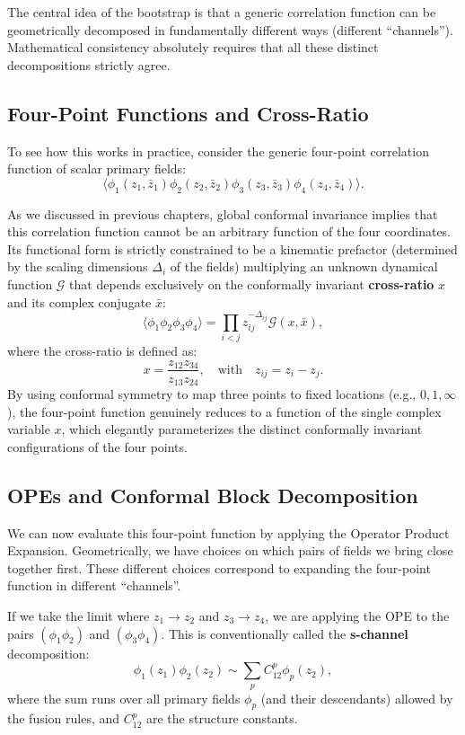 The central idea of the bootstrap is that a generic correlation function can be geometrically decomposed in fundamentally different ways (different ``channels''). Mathematical consistency absolutely requires that all these distinct decompositions strictly agree.

\subsection{Four-Point Functions and Cross-Ratio}

To see how this works in practice, consider the generic four-point correlation function of scalar primary fields:
\[
    \langle \phi_1(z_1, \bar{z}_1) \phi_2(z_2, \bar{z}_2) \phi_3(z_3, \bar{z}_3) \phi_4(z_4, \bar{z}_4) \rangle.
\]

As we discussed in previous chapters, global conformal invariance implies that this correlation function cannot be an arbitrary function of the four coordinates. Its functional form is strictly constrained to be a kinematic prefactor (determined by the scaling dimensions $\Delta_i$ of the fields) multiplying an unknown dynamical function $\mathcal{G}$ that depends exclusively on the conformally invariant \textbf{cross-ratio} $x$ and its complex conjugate $\bar{x}$:
\[
    \langle \phi_1 \phi_2 \phi_3 \phi_4 \rangle = \prod_{i < j} z_{ij}^{-\Delta_{ij}} \mathcal{G}(x, \bar{x}),
\]
where the cross-ratio is defined as:
\[
    x = \frac{z_{12} z_{34}}{z_{13} z_{24}}, \quad \text{with} \quad z_{ij} = z_i - z_j.
\]
By using conformal symmetry to map three points to fixed locations (e.g., $0, 1, \infty$), the four-point function genuinely reduces to a function of the single complex variable $x$, which elegantly parameterizes the distinct conformally invariant configurations of the four points.

\subsection{OPEs and Conformal Block Decomposition}

We can now evaluate this four-point function by applying the Operator Product Expansion. Geometrically, we have choices on which pairs of fields we bring close together first. These different choices correspond to expanding the four-point function in different ``channels''.

If we take the limit where $z_1 \to z_2$ and $z_3 \to z_4$, we are applying the OPE to the pairs $(\phi_1 \phi_2)$ and $(\phi_3 \phi_4)$. This is conventionally called the \textbf{s-channel} decomposition:
\[
    \phi_1(z_1)\phi_2(z_2) \sim \sum_p C_{12}^p \phi_p(z_2),
\]
where the sum runs over all primary fields $\phi_p$ (and their descendants) allowed by the fusion rules, and $C_{12}^p$ are the structure constants.

